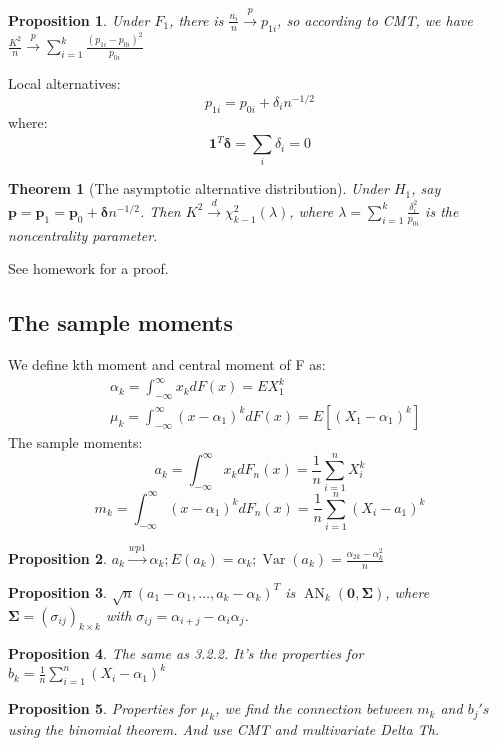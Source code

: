 \documentclass{ctexart}
\newtheorem{theorem}{Theorem}[subsection]
\newtheorem{proposition}{Proposition}[subsection]
\begin{document}
\begin{proposition}
  Under \(F_{1}\), there is \(\frac{n_{i}}{n}\xrightarrow{p}p_{1i}\), so according to CMT, we have \(\frac{K^{2}}{n}\xrightarrow{p}\sum_{i=1}^{k} \frac{(p_{1i}-p_{0i})^{2}}{p_{0i}}\)  
\end{proposition}
Local alternatives: 
\[
p_{1i}=p_{0i}+\delta_{i}n^{-1/2}
\] 
where: 
\[
\boldsymbol{1}^{T}\boldsymbol{\delta}=\sum_{i}^{} \delta_{i}=0
\] 
\begin{theorem}[The asymptotic alternative distribution]
  Under \(H_{1}\), say \(\boldsymbol{p}=\boldsymbol{p}_{1}=\boldsymbol{p}_{0}+\boldsymbol{\delta}n^{-1/2}\). Then \(K^{2}\xrightarrow{d}\chi_{k-1}^{2}(\lambda)\), where \(\lambda=\sum_{i=1}^{k} \frac{\delta^{2}_{i}}{p_{0i}}\) is the noncentrality parameter.     
\end{theorem}
See homework for a proof. 
\subsection{The sample moments}
We define kth moment and central moment of F as: 
\begin{align*}
  &\alpha_{k}=\int_{-\infty}^{\infty}x_{k}dF(x)=EX_{1}^{k}\\
  &\mu_{k}=\int_{-\infty}^{\infty}(x-\alpha_{1})^{k}dF(x)=E[(X_{1}-\alpha_{1})^{k}]
\end{align*} 
The sample moments: 
\[
a_{k}=\int_{-\infty}^{\infty}x_{k}dF_{n}(x)=\frac{1}{n}\sum_{i=1}^{n} X_{i}^{k}
\] 
\[
m_{k}=\int_{-\infty}^{\infty}(x-\alpha_{1})^{k}dF_{n}(x)=\frac{1}{n}\sum_{i=1}^{n} (X_{i}-a_{1})^{k}
\] 
\begin{proposition}
  \(a_{k}\xrightarrow{wp1}\alpha_{k};E(a_{k})=\alpha_{k};\operatorname{Var}(a_{k})=\frac{\alpha_{2k}-\alpha_{k}^{2}}{n}\) 
\end{proposition}
\begin{proposition}
  \(\sqrt{n}(a_{1}-\alpha_{1},\ldots,a_{k}-\alpha_{k})^{T}\) is \(\operatorname{AN}_{k}(\boldsymbol{0},\boldsymbol{\Sigma})\), where \(\boldsymbol{\Sigma}=(\sigma_{ij})_{k\times k}\) with \(\sigma_{ij}=\alpha_{i+j}-\alpha_{i}\alpha_{j}\).   
\end{proposition}
\begin{proposition}
  The same as 3.2.2. It's the properties for \(b_{k}=\frac{1}{n}\sum_{i=1}^{n} (X_{i}-\alpha_{1})^{k}\) 
\end{proposition}
\begin{proposition}
  Properties for \(\mu_{k}\), we find the connection between \(m_{k}\) and \(b_{j}'s\) using the binomial theorem. And use CMT and multivariate Delta Th.    
\end{proposition}
\end{document}
